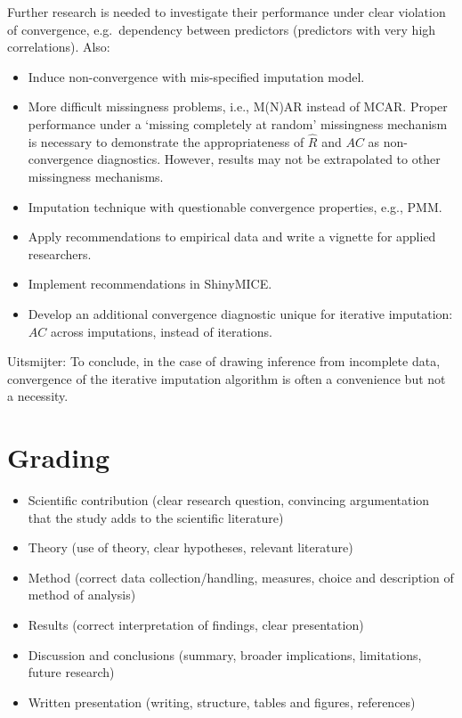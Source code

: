 \documentclass[Royal,times,sageh]{sagej}
\begin{document}
Further research is needed to investigate their performance under clear violation of convergence, e.g.~dependency between predictors (predictors with very high correlations). Also:

\begin{itemize}
\item
  Induce non-convergence with mis-specified imputation model.
\item
  More difficult missingness problems, i.e., M(N)AR instead of MCAR. Proper performance under a `missing completely at random' missingness mechanism is necessary to demonstrate the appropriateness of \(\widehat{R}\) and \(AC\) as non-convergence diagnostics. However, results may not be extrapolated to other missingness mechanisms.
\item
  Imputation technique with questionable convergence properties, e.g., PMM.
\item
  Apply recommendations to empirical data and write a vignette for applied researchers.
\item
  Implement recommendations in ShinyMICE.
\item
  Develop an additional convergence diagnostic unique for iterative imputation: \(AC\) across imputations, instead of iterations.
\end{itemize}

Uitsmijter: To conclude, in the case of drawing inference from incomplete data, convergence of the iterative imputation algorithm is often a convenience but not a necessity.

\hypertarget{grading}{%
\section{Grading}\label{grading}}

\begin{itemize}
\item
  Scientific contribution
  (clear research question, convincing argumentation that the study adds to the scientific literature)
\item
  Theory
  (use of theory, clear hypotheses, relevant literature)
\item
  Method
  (correct data collection/handling, measures, choice and description of method of analysis)
\item
  Results
  (correct interpretation of findings, clear presentation)
\item
  Discussion and conclusions
  (summary, broader implications, limitations, future research)
\item
  Written presentation
  (writing, structure, tables and figures, references)
\end{itemize}



\end{document}
